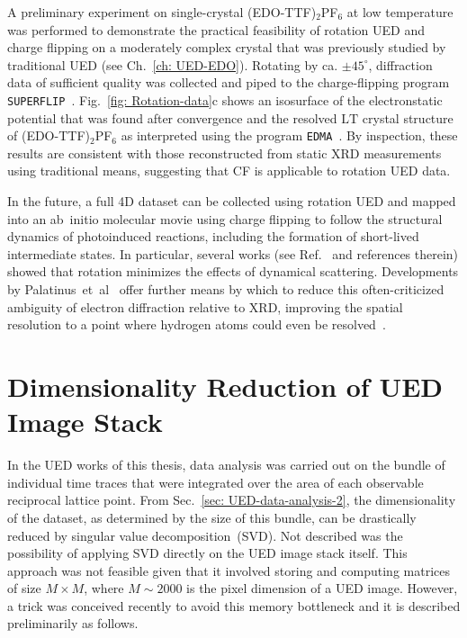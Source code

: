 A preliminary experiment on single-crystal (EDO-TTF)$_2$PF$_6$ at low temperature
was performed to demonstrate the practical feasibility of rotation UED and charge flipping
on a moderately complex crystal that was previously studied by traditional UED (see Ch.~\ref{ch: UED-EDO}).
%
Rotating by ca. $\pm 45^\circ$, diffraction data of sufficient quality was collected
and piped to the charge-flipping program \texttt{SUPERFLIP}~\cite{Palatinus2007}.
%
Fig.~\ref{fig: Rotation-data}c shows an isosurface of the electronstatic potential that
was found after convergence and the resolved $\text{LT}$ crystal structure of (EDO-TTF)$_2$PF$_6$
as interpreted using the program \texttt{EDMA}~\cite{Palatinus2012}.
%
By inspection, these results are consistent with those reconstructed from static XRD measurements
using traditional means, suggesting that CF is applicable to rotation UED data.

In the future, a full 4D dataset can be collected using rotation UED
and mapped into an ab~initio molecular movie using charge flipping
to follow the structural dynamics of photoinduced reactions,
including the formation of short-lived intermediate states.
%
In particular, several works (see Ref.~\cite{Mugnaiolia2015} and references therein)
showed that rotation minimizes the effects of dynamical scattering.
%
Developments by Palatinus~et~al~\cite{Palatinus2013a, Palatinus2015a, Palatinus2015b}
offer further means by which to reduce this often-criticized ambiguity of electron diffraction
relative to XRD, improving the spatial resolution to a point
where hydrogen atoms could even be resolved~\cite{Palatinus2017}.


\section[Dimensionality Reduction of UED Image Stack]{Dimensionality Reduction of UED Image Stack}
\label{sec: UED-SVD}

In the UED works of this thesis, data analysis was carried out
on the bundle of individual time traces that were integrated
over the area of each observable reciprocal lattice point.
%
From Sec.~\ref{sec: UED-data-analysis-2},
the dimensionality of the dataset, as determined by the size of this bundle,
can be drastically reduced by singular value decomposition~(SVD).
%
Not described was the possibility of applying SVD directly on the UED image stack
itself.
%
This approach was not feasible given that it involved storing and computing
matrices of size $M \times M$, where $M \sim 2000$ is the pixel dimension of a UED image.
%
However, a trick was conceived recently to avoid this memory bottleneck
and it is described preliminarily as follows.


